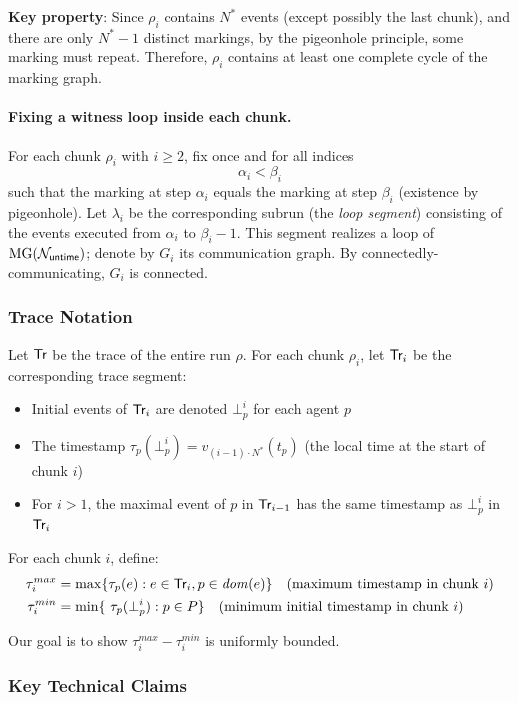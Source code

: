\textbf{Key property}: Since $\rho_i$ contains $N^*$ events (except possibly the last chunk), and there are only $N^* - 1$ distinct markings, by the pigeonhole principle, some marking must repeat. Therefore, $\rho_i$ contains at least one complete cycle of the marking graph.

\paragraph*{Fixing a witness loop inside each chunk.}
For each chunk $\rho_i$ with $i\ge 2$, fix once and for all indices
\[
\alpha_i < \beta_i
\]
such that the marking at step $\alpha_i$ equals the marking at step $\beta_i$ (existence by pigeonhole).
Let $\lambda_i$ be the corresponding subrun (the \emph{loop segment}) consisting of the events executed from
$\alpha_i$ to $\beta_i-1$.
This segment realizes a loop of $\operatorname{MG}(\mathcal{N}_{\mathsf{untime}})$; denote by $G_i$ its communication graph.
By connectedly-communicating, $G_i$ is connected.

\subsubsection{Trace Notation}

Let $\textsf{Tr}$ be the trace of the entire run $\rho$. For each chunk $\rho_i$, let $\textsf{Tr}_i$ be the corresponding trace segment:
\begin{itemize}
\item Initial events of $\textsf{Tr}_i$ are denoted $\bot^i_p$ for each agent $p$
\item The timestamp $\tau_p(\bot^i_p) = v_{(i-1) \cdot N^*}(t_p)$ (the local time at the start of chunk $i$)
\item For $i > 1$, the maximal event of $p$ in $\textsf{Tr}_{i-1}$ has the same timestamp as $\bot^i_p$ in $\textsf{Tr}_i$
\end{itemize}

For each chunk $i$, define:
\begin{align*}
\tau^{max}_i &= \max\{\tau_p(e) : e \in \textsf{Tr}_i, p \in \mathit{dom}(e)\} \quad \text{(maximum timestamp in chunk } i\text{)} \\
\tau^{min}_i &= \min\{\ \tau_p(\bot^i_p) : p \in P\} \quad \text{(minimum initial timestamp in chunk } i\text{)}
\end{align*}

Our goal is to show $\tau^{max}_i - \tau^{min}_i$ is uniformly bounded.

\subsubsection{Key Technical Claims}

